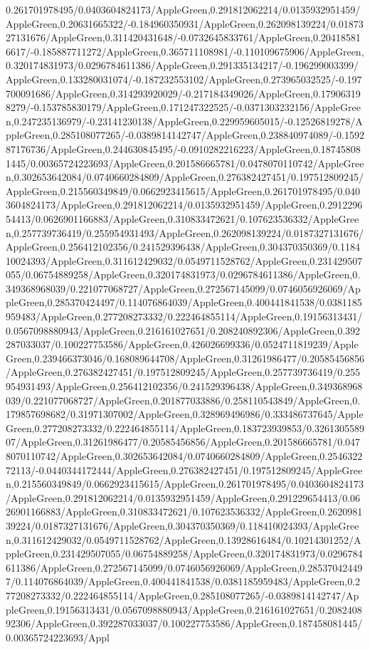 {\begin{tikzternal}
{0.261701978495/0.0403604824173/AppleGreen,0.291812062214/0.0135932951459/AppleGreen,0.20631665322/-0.184960350931/AppleGreen,0.262098139224/0.0187327131676/AppleGreen,0.311420431648/-0.0732645833761/AppleGreen,0.204185816617/-0.185887711272/AppleGreen,0.365711108981/-0.110109675906/AppleGreen,0.320174831973/0.0296784611386/AppleGreen,0.291335134217/-0.196299003399/AppleGreen,0.133280031074/-0.187232553102/AppleGreen,0.273965032525/-0.197700091686/AppleGreen,0.314293920029/-0.217184349026/AppleGreen,0.179063198279/-0.153785830179/AppleGreen,0.171247322525/-0.0371303232156/AppleGreen,0.247235136979/-0.23141230138/AppleGreen,0.229959605015/-0.12526819278/AppleGreen,0.285108077265/-0.0389814142747/AppleGreen,0.238840974089/-0.159287176736/AppleGreen,0.244630845495/-0.0910282216223/AppleGreen,0.187458081445/0.00365724223693/AppleGreen,0.201586665781/0.0478070110742/AppleGreen,0.302653642084/0.0740660284809/AppleGreen,0.276382427451/0.197512809245/AppleGreen,0.215560349849/0.0662923415615/AppleGreen,0.261701978495/0.0403604824173/AppleGreen,0.291812062214/0.0135932951459/AppleGreen,0.291229654413/0.0626901166883/AppleGreen,0.310833472621/0.107623536332/AppleGreen,0.257739736419/0.255954931493/AppleGreen,0.262098139224/0.0187327131676/AppleGreen,0.256412102356/0.241529396438/AppleGreen,0.304370350369/0.118410024393/AppleGreen,0.311612429032/0.0549711528762/AppleGreen,0.231429507055/0.06754889258/AppleGreen,0.320174831973/0.0296784611386/AppleGreen,0.349368968039/0.221077068727/AppleGreen,0.272567145099/0.0746056926069/AppleGreen,0.285370424497/0.114076864039/AppleGreen,0.400441841538/0.0381185959483/AppleGreen,0.277208273332/0.222464855114/AppleGreen,0.19156313431/0.0567098880943/AppleGreen,0.216161027651/0.208240892306/AppleGreen,0.392287033037/0.100227753586/AppleGreen,0.426026699336/0.0524711819239/AppleGreen,0.239466373046/0.168089644708/AppleGreen,0.31261986477/0.20585456856/AppleGreen,0.276382427451/0.197512809245/AppleGreen,0.257739736419/0.255954931493/AppleGreen,0.256412102356/0.241529396438/AppleGreen,0.349368968039/0.221077068727/AppleGreen,0.201877033886/0.258110543849/AppleGreen,0.179857698682/0.31971307002/AppleGreen,0.328969496986/0.333486737645/AppleGreen,0.277208273332/0.222464855114/AppleGreen,0.183723939853/0.326130558907/AppleGreen,0.31261986477/0.20585456856/AppleGreen,0.201586665781/0.0478070110742/AppleGreen,0.302653642084/0.0740660284809/AppleGreen,0.254632272113/-0.0440344172444/AppleGreen,0.276382427451/0.197512809245/AppleGreen,0.215560349849/0.0662923415615/AppleGreen,0.261701978495/0.0403604824173/AppleGreen,0.291812062214/0.0135932951459/AppleGreen,0.291229654413/0.0626901166883/AppleGreen,0.310833472621/0.107623536332/AppleGreen,0.262098139224/0.0187327131676/AppleGreen,0.304370350369/0.118410024393/AppleGreen,0.311612429032/0.0549711528762/AppleGreen,0.13928616484/0.10214301252/AppleGreen,0.231429507055/0.06754889258/AppleGreen,0.320174831973/0.0296784611386/AppleGreen,0.272567145099/0.0746056926069/AppleGreen,0.285370424497/0.114076864039/AppleGreen,0.400441841538/0.0381185959483/AppleGreen,0.277208273332/0.222464855114/AppleGreen,0.285108077265/-0.0389814142747/AppleGreen,0.19156313431/0.0567098880943/AppleGreen,0.216161027651/0.208240892306/AppleGreen,0.392287033037/0.100227753586/AppleGreen,0.187458081445/0.00365724223693/Appl}
\end{tikzternal}}
